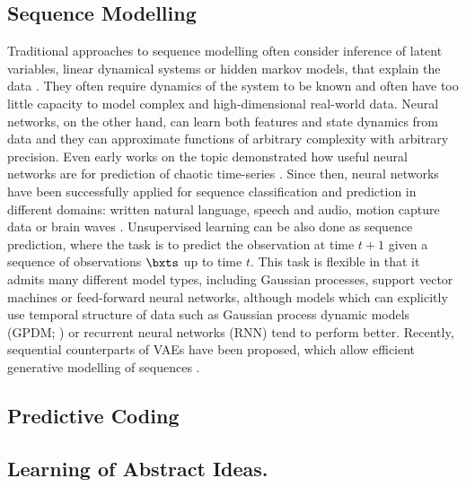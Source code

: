     \subsection{Sequence Modelling}
        Traditional approaches to sequence modelling often consider inference of latent variables, \eg linear dynamical systems or hidden markov models, that explain the data \citep{Bishop2006}.
        They often require dynamics of the system to be known and often have too little capacity to model complex and high-dimensional real-world data.
        Neural networks, on the other hand, can learn both features and state dynamics from data and they can approximate functions of arbitrary complexity with arbitrary precision.
        Even early works on the topic demonstrated how useful neural networks are for prediction of chaotic time-series \citep{Lapedes1988}.
        Since then, neural networks have been successfully applied for sequence classification and prediction in different domains: written natural language, speech and audio, motion capture data or brain waves \citep{Langkvist2014}. 
%
%
        Unsupervised learning can be also done as sequence prediction, where the task is to predict the observation at time $t+1$ given a sequence of observations $\bxts$ up to time $t$. This task is flexible in that it admits many different model types, including Gaussian processes, support vector machines or feed-forward neural networks, although models which can explicitly use temporal structure of data such as Gaussian process dynamic models (GPDM; \cite{Wang2008}) or recurrent neural networks (RNN) tend to perform better. Recently, sequential counterparts of VAEs have been proposed, which allow efficient generative modelling of sequences \citep{Fabius2015,Bayer2015,Karl2017}.
%
%
    \subsection{Predictive Coding}
    
%
%
    \subsection{Learning of Abstract Ideas.}
    
